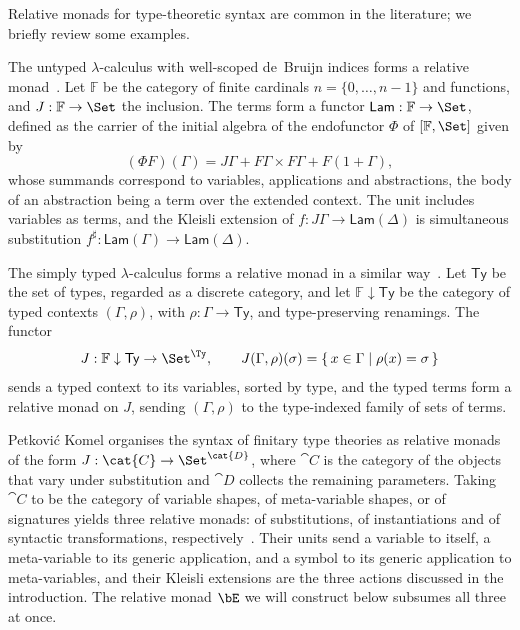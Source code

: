 Relative monads for type-theoretic syntax are common in the literature; we briefly review some examples.

\begin{example}
    The untyped $\lambda$-calculus with well-scoped de~Bruijn indices forms a relative monad~\cite[Ex.~2.4]{AltenkirchChapmanUustalu2015}. Let $\mathbb{F}$ be the category of finite cardinals $n = \{0, \ldots, n - 1\}$ and functions, and $J : \mathbb{F} \to \Set$ the inclusion. The terms form a functor $\mathsf{Lam} : \mathbb{F} \to \Set$, defined as the carrier of the initial algebra of the endofunctor $\Phi$ of $[\mathbb{F}, \Set]$ given by
    \[
    (\Phi F)(\Gamma) = J\Gamma + F\Gamma \times F\Gamma + F(1 + \Gamma),
    \]
    whose summands correspond to variables, applications and abstractions, the body of an abstraction being a term over the extended context. The unit includes variables as terms, and the Kleisli extension of $f : J\Gamma \to \mathsf{Lam}(\Delta)$ is simultaneous substitution $f^\sharp : \mathsf{Lam}(\Gamma) \to \mathsf{Lam}(\Delta)$.
\end{example}

\begin{example}
    The simply typed $\lambda$-calculus forms a relative monad in a similar way~\cite[Ex.~2.5]{AltenkirchChapmanUustalu2015}. Let $\mathsf{Ty}$ be the set of types, regarded as a discrete category, and let $\mathbb{F} \downarrow \mathsf{Ty}$ be the category of typed contexts $(\Gamma, \rho)$, with $\rho : \Gamma \to \mathsf{Ty}$, and type-preserving renamings. The functor
    \[
    J : \mathbb{F} \downarrow \mathsf{Ty} \to \Set^{\Ty}, \qquad J(\Gamma, \rho)(\sigma) = \{\, x \in \Gamma \mid \rho(x) = \sigma \,\}
    \]
    sends a typed context to its variables, sorted by type, and the typed terms form a relative monad on $J$, sending $(\Gamma, \rho)$ to the type-indexed family of sets of terms.
\end{example}

\begin{example}
    Petković Komel organises the syntax of finitary type theories as relative monads of the form $J : \cat{C} \to \Set^{\cat{D}}$, where $\cat{C}$ is the category of the objects that vary under substitution and $\cat{D}$ collects the remaining parameters. Taking $\cat{C}$ to be the category of variable shapes, of meta-variable shapes, or of signatures yields three relative monads: of substitutions, of instantiations and of syntactic transformations, respectively~\cite[\S\S7.2, 7.3 and 8.3]{PetkovicKomel2021}. Their units send a variable to itself, a meta-variable to its generic application, and a symbol to its generic application to meta-variables, and their Kleisli extensions are the three actions discussed in the introduction. The relative monad $\bE$ we will construct below subsumes all three at once.
\end{example}

